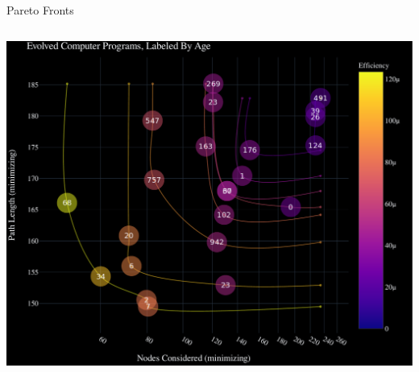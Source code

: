 \documentclass[aspectratio=169]{beamer}
\begin{document}
\begin{frame}{Pareto Fronts}
\begin{columns}[T]
\begin{column}{.6\linewidth}
      \includegraphics[width=0.9\linewidth, keepaspectratio]{figures/total_pareto_overview.pdf}
      \end{column}
  \end{columns}
\end{frame}
\end{document}
